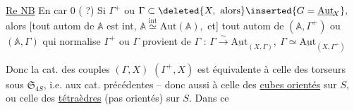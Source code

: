 \deleted{\unsure{$\simeq$}} \uline{Re NB} En car $0$ ( ?) Si $\Gamma^{+}$ ou $\Gamma\subset\deleted{X,\ \text{alors}}\inserted{G=\underline{\mathrm{Aut}}_{\!X}},$ alors [tout autom de $\mathbb A$ est int, $\mathbb A\mathrel{\overset{\mathrm{int}}{\simeq}}\mathrm{Aut}(\mathbb A),$ et] tout autom de $(\mathbb A,\Gamma^{+})$ ou $(\mathbb A,\Gamma)$ qui normalise $\Gamma^{+}$ ou $\Gamma$ provient de $\Gamma$ : $\Gamma\xrightarrow{\sim}\underline{\mathrm{Aut}}_{(X,\Gamma)},\ \Gamma\simeq\underline{\mathrm{Aut}}_{(X,\Gamma^{+})}$

Donc la cat. des couples $(\Gamma,X)$ $(\Gamma^{+},X)$ est équivalente à celle des torseurs sous $\mathfrak S_{4S}$, i.e. aux cat. précédentes -- donc aussi à celle des \uline{cubes orientés} sur $S$, ou celle des \uline{tétraèdres} (pas  orientés) sur $S$. Dans ce

